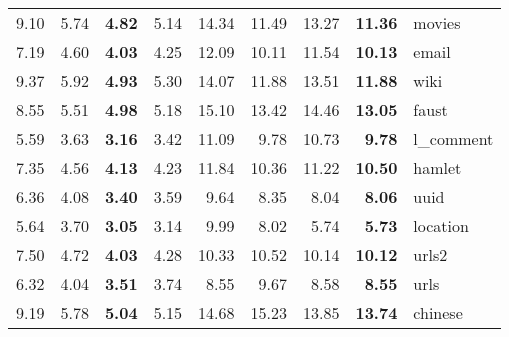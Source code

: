 {\begin{tabular}{|rrrr|rrrr|l|}
{\scriptsize{ 9.10}}& {\scriptsize{ 5.74}}& {\scriptsize{\bf  4.82}}& {\scriptsize{ 5.14}}& {\scriptsize{14.34}}& {\scriptsize{11.49}}& {\scriptsize{13.27}}& {\scriptsize{\bf 11.36}}& {\scriptsize movies}\\
{\scriptsize{ 7.19}}& {\scriptsize{ 4.60}}& {\scriptsize{\bf  4.03}}& {\scriptsize{ 4.25}}& {\scriptsize{12.09}}& {\scriptsize{10.11}}& {\scriptsize{11.54}}& {\scriptsize{\bf 10.13}}& {\scriptsize email}\\
{\scriptsize{ 9.37}}& {\scriptsize{ 5.92}}& {\scriptsize{\bf  4.93}}& {\scriptsize{ 5.30}}& {\scriptsize{14.07}}& {\scriptsize{11.88}}& {\scriptsize{13.51}}& {\scriptsize{\bf 11.88}}& {\scriptsize wiki}\\
{\scriptsize{ 8.55}}& {\scriptsize{ 5.51}}& {\scriptsize{\bf  4.98}}& {\scriptsize{ 5.18}}& {\scriptsize{15.10}}& {\scriptsize{13.42}}& {\scriptsize{14.46}}& {\scriptsize{\bf 13.05}}& {\scriptsize faust}\\
{\scriptsize{ 5.59}}& {\scriptsize{ 3.63}}& {\scriptsize{\bf  3.16}}& {\scriptsize{ 3.42}}& {\scriptsize{11.09}}& {\scriptsize{ 9.78}}& {\scriptsize{10.73}}& {\scriptsize{\bf  9.78}}& {\scriptsize l\_comment}\\
{\scriptsize{ 7.35}}& {\scriptsize{ 4.56}}& {\scriptsize{\bf  4.13}}& {\scriptsize{ 4.23}}& {\scriptsize{11.84}}& {\scriptsize{10.36}}& {\scriptsize{11.22}}& {\scriptsize{\bf 10.50}}& {\scriptsize hamlet}\\
{\scriptsize{ 6.36}}& {\scriptsize{ 4.08}}& {\scriptsize{\bf  3.40}}& {\scriptsize{ 3.59}}& {\scriptsize{ 9.64}}& {\scriptsize{ 8.35}}& {\scriptsize{ 8.04}}& {\scriptsize{\bf  8.06}}& {\scriptsize uuid}\\
{\scriptsize{ 5.64}}& {\scriptsize{ 3.70}}& {\scriptsize{\bf  3.05}}& {\scriptsize{ 3.14}}& {\scriptsize{ 9.99}}& {\scriptsize{ 8.02}}& {\scriptsize{ 5.74}}& {\scriptsize{\bf  5.73}}& {\scriptsize location}\\
{\scriptsize{ 7.50}}& {\scriptsize{ 4.72}}& {\scriptsize{\bf  4.03}}& {\scriptsize{ 4.28}}& {\scriptsize{10.33}}& {\scriptsize{10.52}}& {\scriptsize{10.14}}& {\scriptsize{\bf 10.12}}& {\scriptsize urls2}\\
{\scriptsize{ 6.32}}& {\scriptsize{ 4.04}}& {\scriptsize{\bf  3.51}}& {\scriptsize{ 3.74}}& {\scriptsize{ 8.55}}& {\scriptsize{ 9.67}}& {\scriptsize{ 8.58}}& {\scriptsize{\bf  8.55}}& {\scriptsize urls}\\
{\scriptsize{ 9.19}}& {\scriptsize{ 5.78}}& {\scriptsize{\bf  5.04}}& {\scriptsize{ 5.15}}& {\scriptsize{14.68}}& {\scriptsize{15.23}}& {\scriptsize{13.85}}& {\scriptsize{\bf 13.74}}& {\scriptsize chinese}\\

\end{tabular}}

